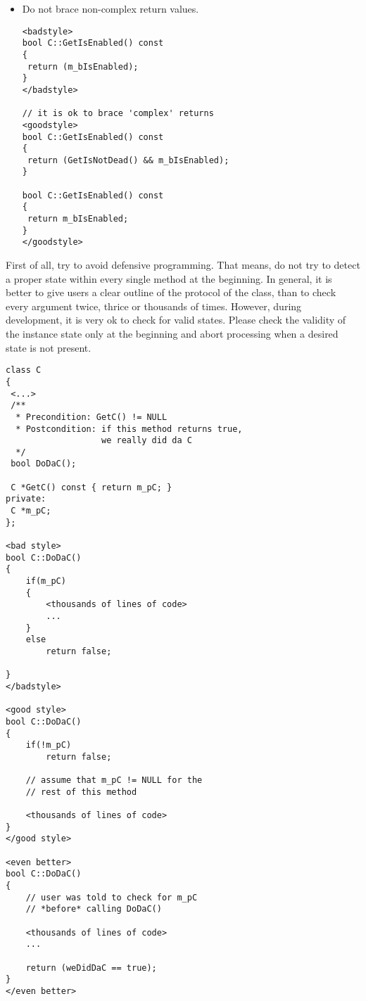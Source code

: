 \begin{itemize}
\begin{verbatim}
<goodstyle>
switch(nType)
{
 case 1:
 {
  break;
 }
 default:
 {
  break;
 }
}
</goodstyle>
\end{verbatim}
The above does not look too nice, but is necessary to correctly scope your local variables, especially when doing nested  blocks.
\item Do not brace non-complex return values.
\begin{verbatim}
<badstyle>
bool C::GetIsEnabled() const
{
 return (m_bIsEnabled);
}
</badstyle>

// it is ok to brace 'complex' returns
<goodstyle>
bool C::GetIsEnabled() const
{
 return (GetIsNotDead() && m_bIsEnabled);
}

bool C::GetIsEnabled() const
{
 return m_bIsEnabled;
}
</goodstyle>
\end{verbatim}
\end{itemize}

First of all, try to avoid defensive programming.
That means, do not try to detect a proper state within every single method at the beginning.
In general, it is better to give users a clear outline of the protocol of the class, than to check every argument twice, thrice or thousands of times.
However, during development, it is very ok to check for valid states.
Please check the validity of the instance state only at the beginning and abort processing when a desired state is not present.
\begin{verbatim}
class C
{
 <...>
 /**
  * Precondition: GetC() != NULL
  * Postcondition: if this method returns true,
                   we really did da C
  */
 bool DoDaC();
 
 C *GetC() const { return m_pC; }
private:
 C *m_pC;
};

<bad style>
bool C::DoDaC()
{
	if(m_pC)
	{
		<thousands of lines of code>
		...
	}
	else
		return false;
	
}
</badstyle>

<good style>
bool C::DoDaC()
{
	if(!m_pC)
		return false;
	
	// assume that m_pC != NULL for the
	// rest of this method
	
	<thousands of lines of code>	
}
</good style>

<even better>
bool C::DoDaC()
{
	// user was told to check for m_pC
	// *before* calling DoDaC()
	
	<thousands of lines of code>
	...
	
	return (weDidDaC == true);
}
</even better>
\end{verbatim}

